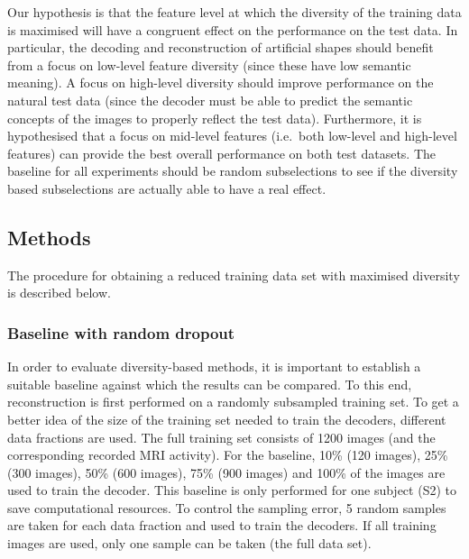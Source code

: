 Our hypothesis is that the feature level at which the diversity of the training data is maximised will have a congruent effect on the performance on the test data. In particular, the decoding and reconstruction of artificial shapes should benefit from a focus on low-level feature diversity (since these have low semantic meaning). A focus on high-level diversity should improve performance on the natural test data (since the decoder must be able to predict the semantic concepts of the images to properly reflect the test data). Furthermore, it is hypothesised that a focus on mid-level features (i.e.\ both low-level and high-level features) can provide the best overall performance on both test datasets. The baseline for all experiments should be random subselections to see if the diversity based subselections are actually able to have a real effect.



\subsection{Methods}

The procedure for obtaining a reduced training data set with maximised diversity is described below.

\subsubsection{Baseline with random dropout}

In order to evaluate diversity-based methods, it is important to establish a suitable baseline against which the results can be compared. To this end, reconstruction is first performed on a randomly subsampled training set. To get a better idea of the size of the training set needed to train the decoders, different data fractions are used. The full training set consists of 1200 images (and the corresponding recorded MRI activity). For the baseline, 10\% (120 images), 25\% (300 images), 50\% (600 images), 75\% (900 images) and 100\% of the images are used to train the decoder. This baseline is only performed for one subject (S2) to save computational resources. To control the sampling error, 5 random samples are taken for each data fraction and used to train the decoders. If all training images are used, only one sample can be taken (the full data set). 

